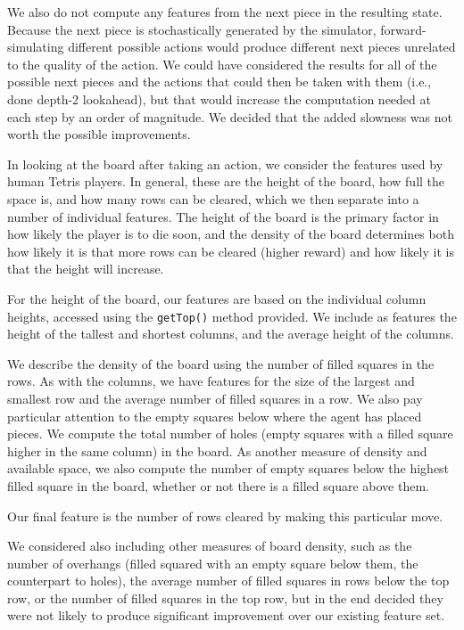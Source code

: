 \documentclass[11pt]{article}
\begin{document}
We also do not compute any features from the next piece in the resulting state.  Because the next piece is stochastically generated by the simulator, forward-simulating different possible actions would produce different next pieces unrelated to the quality of the action.  We could have considered the results for all of the possible next pieces and the actions that could then be taken with them (i.e., done depth-2 lookahead), but that would increase the computation needed at each step by an order of magnitude.  We decided that the added slowness was not worth the possible improvements.

In looking at the board after taking an action, we consider the features used by human Tetris players.  In general, these are the height of the board, how full the space is, and how many rows can be cleared, which we then separate into a number of individual features.  The height of the board is the primary factor in how likely the player is to die soon, and the density of the board determines both how likely it is that more rows can be cleared (higher reward) and how likely it is that the height will increase.

For the height of the board, our features are based on the individual column heights, accessed using the \texttt{getTop()} method provided.  We include as features the height of the tallest and shortest columns, and the average height of the columns.

We describe the density of the board using the number of filled squares in the rows.  As with the columns, we have features for the size of the largest and smallest row and the average number of filled squares in a row.  We also pay particular attention to the empty squares below where the agent has placed pieces.  We compute the total number of holes (empty squares with a filled square higher in the same column) in the board.  As another measure of density and available space, we also compute the number of empty squares below the highest filled square in the board, whether or not there is a filled square above them.

Our final feature is the number of rows cleared by making this particular move.

We considered also including other measures of board density, such as the number of overhangs (filled squared with an empty square below them, the counterpart to holes), the average number of filled squares in rows below the top row, or the number of filled squares in the top row, but in the end decided they were not likely to produce significant improvement over our existing feature set.
\end{document}
